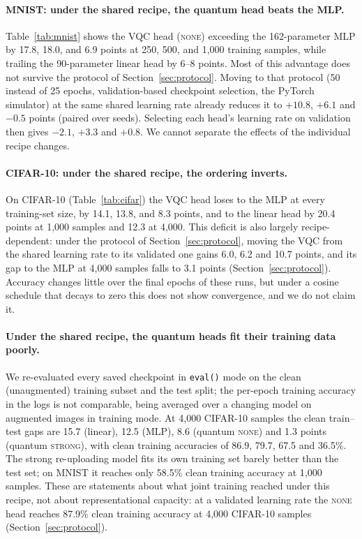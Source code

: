 \documentclass[10pt]{article}
\begin{document}
\paragraph{MNIST: under the shared recipe, the quantum head beats the MLP.}
Table~\ref{tab:mnist} shows the VQC head (\textsc{none}) exceeding the
162-parameter MLP by 17.8, 18.0, and 6.9 points at 250, 500, and 1{,}000
training samples, while trailing the 90-parameter linear head by 6--8 points.
Most of this advantage does not survive the protocol of
Section~\ref{sec:protocol}. Moving to that protocol (50 instead of 25 epochs,
validation-based checkpoint selection, the PyTorch simulator) at the same
shared learning rate already reduces it to $+10.8$, $+6.1$ and $-0.5$ points
(paired over seeds). Selecting each head's learning rate on validation then
gives $-2.1$, $+3.3$ and $+0.8$. We cannot separate the effects of the
individual recipe changes.

\paragraph{CIFAR-10: under the shared recipe, the ordering inverts.}
On CIFAR-10 (Table~\ref{tab:cifar}) the VQC head loses to the MLP at every
training-set size, by 14.1, 13.8, and 8.3 points, and to the linear head by
20.4 points at 1{,}000 samples and 12.3 at 4{,}000. This deficit is also
largely recipe-dependent: under the protocol of Section~\ref{sec:protocol},
moving the VQC from the shared learning rate to its validated one gains 6.0,
6.2 and 10.7 points, and its gap to the MLP at 4{,}000 samples falls to 3.1 points
(Section~\ref{sec:protocol}). Accuracy changes little over the final epochs of
these runs, but under a cosine schedule that decays to zero this does not show
convergence, and we do not claim it.

\paragraph{Under the shared recipe, the quantum heads fit their training data poorly.}
We re-evaluated every saved checkpoint in \texttt{eval()} mode on the clean
(unaugmented) training subset and the test split; the per-epoch training
accuracy in the logs is not comparable, being averaged over a changing model on
augmented images in training mode. At 4{,}000 CIFAR-10 samples the clean
train--test gaps are 15.7 (linear), 12.5 (MLP), 8.6 (quantum \textsc{none}) and
1.3 points (quantum \textsc{strong}), with clean training accuracies of 86.9,
79.7, 67.5 and 36.5\%. The strong re-uploading model fits its own training set
barely better than the test set; on MNIST it reaches only 58.5\% clean training
accuracy at 1{,}000 samples. These are statements about what joint training
reached under this recipe, not about representational capacity: at a validated
learning rate the \textsc{none} head reaches 87.9\% clean training accuracy at
4{,}000 CIFAR-10 samples (Section~\ref{sec:protocol}).
\end{document}
